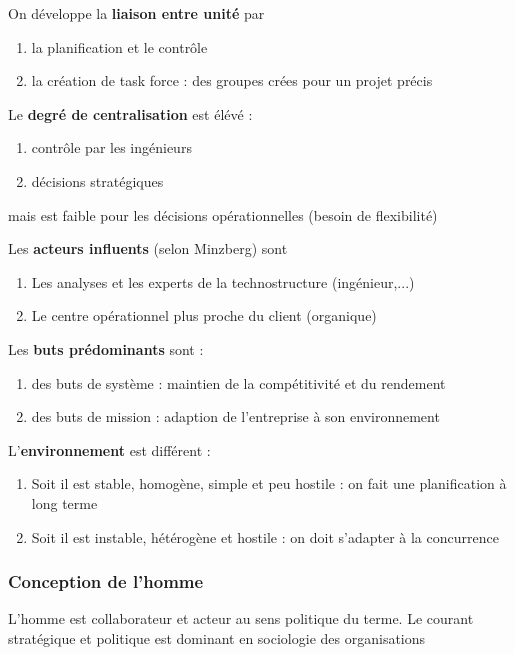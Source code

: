 \documentclass[12pt]{article}
\begin{document}
	On développe la \textbf{liaison entre unité} par
	\begin{enumerate}
	 \item la planification et le contrôle
	 \item la création de \og{} task force\fg{} : des groupes crées pour un projet précis
	\end{enumerate}
	
	Le \textbf{degré de centralisation} est élévé :
	\begin{enumerate}
	 \item contrôle par les ingénieurs
	 \item décisions stratégiques
	\end{enumerate}
	mais est faible pour les décisions opérationnelles (besoin de flexibilité)
	
	Les \textbf{acteurs influents} (selon Minzberg) sont
	\begin{enumerate}
	 \item Les analyses et les experts de la technostructure (ingénieur,...)
	 \item Le centre opérationnel plus proche du client (organique)
	\end{enumerate}
	
	Les \textbf{buts prédominants} sont :
	\begin{enumerate}
	 \item des buts de système : maintien de la compétitivité et du rendement
	 \item des buts de mission : adaption de l'entreprise à son environnement
	\end{enumerate}
	
	L'\textbf{environnement} est différent :
	\begin{enumerate}
	 \item Soit il est stable, homogène, simple et peu hostile : on fait une planification à long terme
	 \item Soit il est instable, hétérogène et hostile : on doit s'adapter à la concurrence
	\end{enumerate}

	
	
	\subsubsection{Conception de l'homme}
	L'homme est collaborateur et acteur au sens politique du terme. Le courant stratégique et politique est dominant en sociologie des organisations
	
\end{document}
